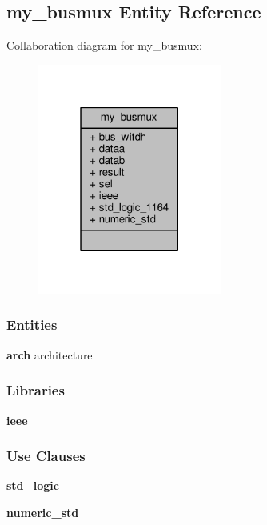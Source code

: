\subsection{my\+\_\+busmux Entity Reference}
\label{classmy__busmux}


Collaboration diagram for my\+\_\+busmux\+:\nopagebreak
\begin{figure}[H]
\begin{center}
\leavevmode
\includegraphics[width=171pt]{de/da3/classmy__busmux__coll__graph}
\end{center}
\end{figure}
\subsubsection*{Entities}
\begin{DoxyCompactItemize}
\item 
{\bf arch} architecture
\end{DoxyCompactItemize}
\subsubsection*{Libraries}
 \begin{DoxyCompactItemize}
\item 
{\bf ieee} 
\end{DoxyCompactItemize}
\subsubsection*{Use Clauses}
 \begin{DoxyCompactItemize}
\item 
{\bf std\+\_\+logic\+\_}   
\item 
{\bf numeric\+\_\+std}   
\end{DoxyCompactItemize}
